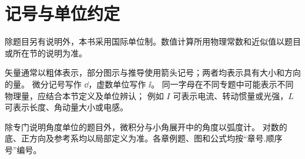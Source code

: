 \section*{记号与单位约定}
{}
除题目另有说明外，本书采用国际单位制。数值计算所用物理常数和近似值以题目或所在节的说明为准。

矢量通常以粗体表示，部分图示与推导使用箭头记号；两者均表示具有大小和方向的量。
微分记号写作 $\dd$，虚数单位写作 $\ii$。
同一字母在不同专题中可能表示不同物理量，应结合本节定义及单位辨认；
例如 $I$ 可表示电流、转动惯量或光强，$L$ 可表示长度、角动量大小或电感。

除专门说明角度单位的题目外，微积分与小角展开中的角度以弧度计。
对数的底、正方向及参考系均以局部定义为准。各章例题、图和公式均按“章号.顺序号”编号。
